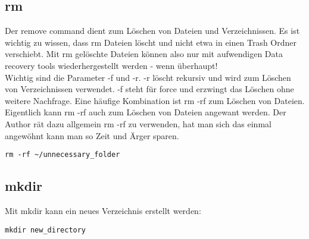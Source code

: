 \subsection{rm}
Der remove command dient zum L\"oschen von Dateien und Verzeichnissen. Es ist wichtig zu wissen, dass rm Dateien l\"oscht und nicht etwa in einen Trash Ordner verschiebt. Mit rm gel\"oschte Dateien k\"onnen also nur mit aufwendigen Data recovery tools wiederhergestellt werden - wenn \"uberhaupt!\\
Wichtig sind die Parameter -f und -r. -r l\"oscht rekursiv und wird zum L\"oschen von Verzeichnissen verwendet. -f steht f\"ur force und erzwingt das L\"oschen ohne weitere Nachfrage. Eine h\"aufige Kombination ist rm -rf zum L\"oschen von Dateien. Eigentlich kann rm -rf auch zum L\"oschen von Dateien angewant werden. Der Author r\"at dazu allgemein rm -rf zu verwenden, hat man sich das einmal angew\"ohnt kann man so Zeit und \"Arger sparen.
\begin{lstlisting}
rm -rf ~/unnecessary_folder
\end{lstlisting}
\subsection{mkdir}
Mit mkdir kann ein neues Verzeichnis erstellt werden:
\begin{lstlisting}
mkdir new_directory
\end{lstlisting}

